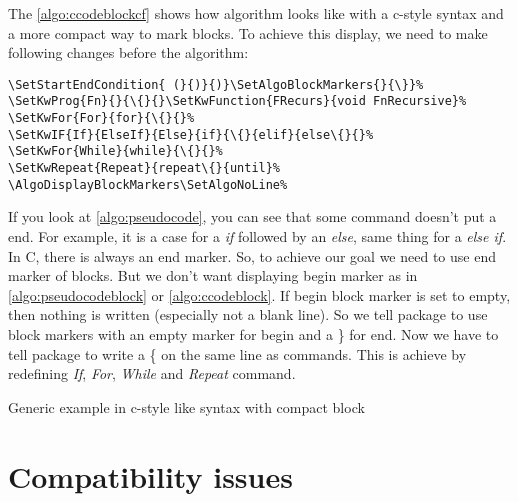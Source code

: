 \documentclass[a4paper]{article}
\begin{document}
The \autoref{algo:ccodeblockcf} shows how algorithm looks like with a c-style
syntax and a more compact way to mark blocks. To achieve this display, we need to make following changes before the algorithm:\vspace{-1.5ex}
\begin{verbatim}
\SetStartEndCondition{ (}{)}{)}\SetAlgoBlockMarkers{}{\}}%
\SetKwProg{Fn}{}{\{}{}\SetKwFunction{FRecurs}{void FnRecursive}%
\SetKwFor{For}{for}{\{}{}%
\SetKwIF{If}{ElseIf}{Else}{if}{\{}{elif}{else\{}{}%
\SetKwFor{While}{while}{\{}{}%
\SetKwRepeat{Repeat}{repeat\{}{until}%
\AlgoDisplayBlockMarkers\SetAlgoNoLine%
\end{verbatim}
\vspace{-1.5ex} If you look at \autoref{algo:pseudocode}, you can see that some command
doesn't put a end. For example, it is a case for a \emph{if} followed by an \emph{else},
same thing for a \emph{else if}. In C, there is always an end marker. So, to achieve our
goal we need to use end marker of blocks. But we don't want displaying begin marker as in
\autoref{algo:pseudocodeblock} or \autoref{algo:ccodeblock}. If begin block marker is set to
empty, then nothing is written (especially not a blank line). So we tell package to use
block markers with an empty marker for begin and a \} for end. Now we have to tell package
to write a \{ on the same line as commands. This is achieve by redefining \emph{If},
\emph{For}, \emph{While} and \emph{Repeat} command.
\begin{algorithm}\AlgoDisplayBlockMarkers\SetAlgoLongEnd\SetAlgoNoLine%
\SetStartEndCondition{ (}{)}{)}\SetAlgoBlockMarkers{}{\}}%
%
%
%
%
%
  \caption{Generic example in c-style like syntax with compact block}\label{algo:ccodeblockcf}
  
\end{algorithm}


\section{Compatibility issues}
\end{document}
